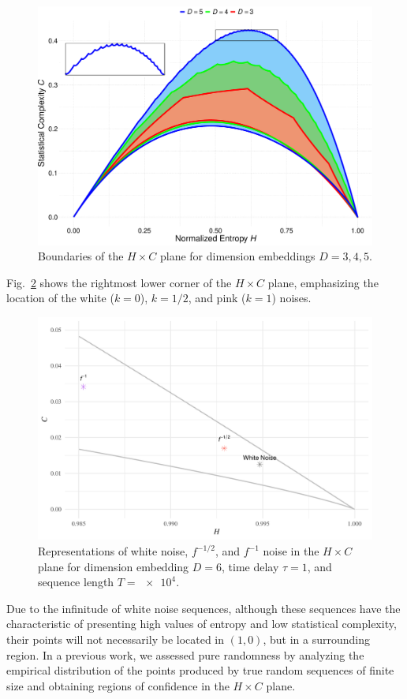 \documentclass[12pt]{article}
\begin{document}
	\begin{figure}[hbt]
		\centering
		\includegraphics[width=.7\linewidth]{Figures/BoundariesPlot}
		\caption{Boundaries of the $H\times C$ plane for dimension embeddings $D=3,4,5$.}\label{fig:Boundaries}
	\end{figure}
	
	Fig.~\ref{fig:RightMostCorner} shows the rightmost lower corner of the $H\times C$ plane, emphasizing the location of the white ($k=0$), $k=1/2$, and pink ($k=1$) noises.
	
	\begin{figure}[hbt]
		\centering
		\includegraphics[width=\linewidth]{RightMostCorner}
		\caption{Representations of white noise, $f^{-1/2}$, and $f^{-1}$ noise in the $H \times C$ plane  for dimension embedding $D = 6$, time delay $\tau = 1$, and sequence length $T = \num[scientific-notation=true]{e4}$.}
		\label{fig:RightMostCorner}
	\end{figure}
	
	Due to the infinitude of white noise sequences, although these sequences have the characteristic of presenting high values of entropy and low statistical complexity, their points will not necessarily be located in $(1, 0)$, but in a surrounding region.
	In a previous work, we assessed pure randomness by analyzing the empirical distribution of the points produced by true random sequences of finite size and obtaining regions of confidence in the $H \times C$ plane.
	
\end{document}
